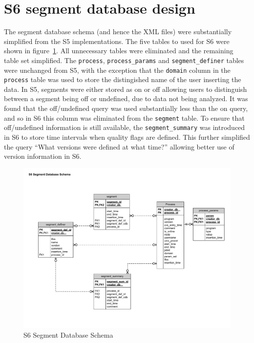 \section{S6 segment database design}

The segment database schema (and hence the XML files) were
substantially simplified from the S5 implementations.  The five tables
to used for S6 were shown in figure~\ref{f:schema}. All unnecessary
tables were eliminated and the remaining table set simplified.
The \verb|process|, \verb|process_params| and \verb|segment_definer|
tables were unchanged from S5, with the exception that the
\verb|domain| column in the \verb|process| table was used to store the
distingished name of the user inserting the data.  In S5, segments
were either stored as on or off allowing users to distinguish between
a segment being off or undefined, due to data not being analyzed. It
was found that the off/undefined query was used substantially less
than the on query, and so in S6 this column was eliminated from the
\verb|segment| table.  To ensure that off/undefined information is
still available, the \verb|segment_summary| was introduced in S6 to
store time intervals when quality flags are defined. This further
simplified the query ``What versions were defined at what time?''
allowing better use of version information in S6.

\begin{figure}[h]
  \begin{center}
    \includegraphics[width=0.9\linewidth]{figures/segdb/T0900005_fig3}
  \end{center}
  \label{f:schema}
  \caption{S6 Segment Database Schema}
\end{figure}





